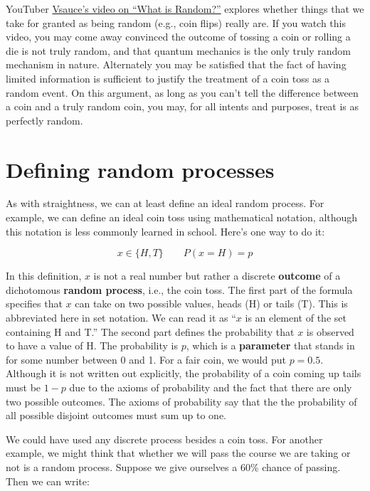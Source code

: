\documentclass[
  openany]{book}
\begin{document}
YouTuber \href{https://www.youtube.com/watch?v=9rIy0xY99a0}{Vsauce's video on ``What is Random?''} explores whether things that we take for granted as being random (e.g., coin flips) really are. If you watch this video, you may come away convinced the outcome of tossing a coin or rolling a die is not truly random, and that quantum mechanics is the only truly random mechanism in nature. Alternately you may be satisfied that the fact of having limited information is sufficient to justify the treatment of a coin toss as a random event. On this argument, as long as you can't tell the difference between a coin and a truly random coin, you may, for all intents and purposes, treat is as perfectly random.

\hypertarget{defining-random-processes}{%
\section{Defining random processes}\label{defining-random-processes}}

As with straightness, we can at least define an ideal random process. For example, we can define an ideal coin toss using mathematical notation, although this notation is less commonly learned in school. Here's one way to do it:

\[ x \in \{H, T\} \qquad P(x=H) = p\]

In this definition, \(x\) is not a real number but rather a discrete \textbf{outcome} of a dichotomous \textbf{random process}, i.e., the coin toss. The first part of the formula specifies that \(x\) can take on two possible values, heads (H) or tails (T). This is abbreviated here in set notation. We can read it as ``\(x\) is an element of the set containing H and T.'' The second part defines the probability that \(x\) is observed to have a value of H. The probability is \(p\), which is a \textbf{parameter} that stands in for some number between 0 and 1. For a fair coin, we would put \(p=0.5\). Although it is not written out explicitly, the probability of a coin coming up tails must be \(1-p\) due to the axioms of probability and the fact that there are only two possible outcomes. The axioms of probability say that the the probability of all possible disjoint outcomes must sum up to one.

We could have used any discrete process besides a coin toss. For another example, we might think that whether we will pass the course we are taking or not is a random process. Suppose we give ourselves a 60\% chance of passing. Then we can write:
\end{document}

